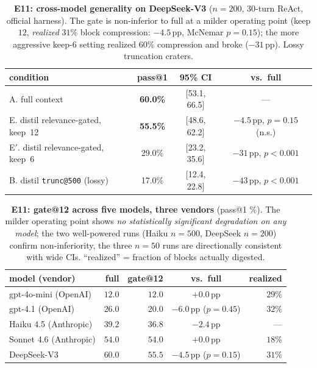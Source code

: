\documentclass[11pt]{article}
\begin{document}
\begin{table}[t]
\centering\small
\begin{tabular}{@{}l c c c@{}}
\toprule
condition & pass@1 & 95\% CI & vs.\ full \\
\midrule
A. full context & \textbf{60.0\%} & [53.1, 66.5] & --- \\
E. distil relevance-gated, keep~12 & \textbf{55.5\%} & [48.6, 62.2] & $-4.5$\,pp, $p{=}0.15$ (n.s.) \\
E$'$. distil relevance-gated, keep~6 & 29.0\% & [23.2, 35.6] & $-31$\,pp, $p{<}0.001$ \\
B. distil \texttt{trunc@500} (lossy) & 17.0\% & [12.4, 22.8] & $-43$\,pp, $p{<}0.001$ \\
\bottomrule
\end{tabular}
\caption{\textbf{E11: cross-model generality on DeepSeek-V3} ($n{=}200$, 30-turn ReAct,
official harness). The gate is non-inferior to full at a milder operating point (keep $12$,
\emph{realized} $31\%$ block compression: $-4.5$\,pp, McNemar $p{=}0.15$); the more aggressive
keep-$6$ setting realized $60\%$ compression and broke ($-31$\,pp). Lossy truncation craters.}
\label{tab:e11}
\end{table}

\begin{table}[t]
\centering\small
\begin{tabular}{@{}l r r c r@{}}
\toprule
model (vendor) & full & gate@12 & vs.\ full & realized \\
\midrule
gpt-4o-mini (OpenAI) & $12.0$ & $12.0$ & $+0.0$\,pp & $29\%$ \\
gpt-4.1 (OpenAI) & $26.0$ & $20.0$ & $-6.0$\,pp ($p{=}0.45$) & $32\%$ \\
Haiku 4.5 (Anthropic) & $39.2$ & $36.8$ & $-2.4$\,pp & --- \\
Sonnet 4.6 (Anthropic) & $54.0$ & $54.0$ & $+0.0$\,pp & $18\%$ \\
DeepSeek-V3 & $60.0$ & $55.5$ & $-4.5$\,pp ($p{=}0.15$) & $31\%$ \\
\bottomrule
\end{tabular}
\caption{\textbf{E11: gate@12 across five models, three vendors} (pass@1 \%). The milder
operating point shows \emph{no statistically significant degradation on any model}; the two
well-powered runs (Haiku $n{=}500$, DeepSeek $n{=}200$) confirm non-inferiority, the three
$n{=}50$ runs are directionally consistent with wide CIs. ``realized'' = fraction of blocks
actually digested.}
\label{tab:e11all}
\end{table}
\end{document}
